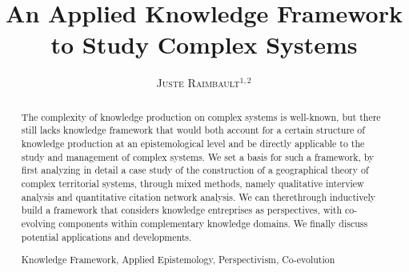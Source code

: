\documentclass[runningheads,a4paper]{llncs2e/llncs}
\newcommand{\keywords}[1]{\par\addvspace\baselineskip
\noindent\keywordname\enspace\ignorespaces#1}
\newcommand{\noun}[1]{\textsc{#1}}
\begin{document}
\mainmatter  %




\title{An Applied Knowledge Framework to Study Complex Systems}


%
%
\author{\noun{Juste Raimbault}$^{1,2}$}
%


\maketitle


\begin{abstract}
The complexity of knowledge production on complex systems is well-known, but there still lacks knowledge framework that would both account for a certain structure of knowledge production at an epistemological level and be directly applicable to the study and management of complex systems. We set a basis for such a framework, by first analyzing in detail a case study of the construction of a geographical theory of complex territorial systems, through mixed methods, namely qualitative interview analysis and quantitative citation network analysis. We can therethrough inductively build a framework that considers knowledge entreprises as perspectives, with co-evolving components within complementary knowledge domains. We finally discuss potential applications and developments.

\keywords{Knowledge Framework, Applied Epistemology, Perspectivism, Co-evolution}
\end{abstract}
\end{document}
